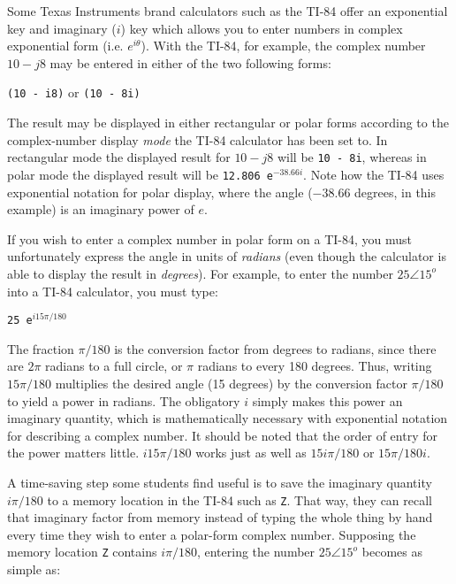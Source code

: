 \vskip 10pt

\filbreak

Some Texas Instruments brand calculators such as the TI-84 offer an exponential key and imaginary ($i$) key which allows you to enter numbers in complex exponential form (i.e. $e^{i \theta}$).  With the TI-84, for example, the complex number $10 - j8$ may be entered in either of the two following forms:

\vskip 10pt

{\tt (10 - i8)} \hskip 10pt or \hskip 10pt {\tt (10 - 8i)} 

\vskip 10pt

The result may be displayed in either rectangular or polar forms according to the complex-number display {\it mode} the TI-84 calculator has been set to.  In rectangular mode the displayed result for $10 - j8$ will be {\tt 10 - 8i}, whereas in polar mode the displayed result will be {\tt 12.806 e$^{-38.66i}$}.  Note how the TI-84 uses exponential notation for polar display, where the angle ($-38.66$ degrees, in this example) is an imaginary power of $e$.

\vskip 10pt

If you wish to enter a complex number in polar form on a TI-84, you must unfortunately express the angle in units of {\it radians} (even though the calculator is able to display the result in {\it degrees}).  For example, to enter the number $25 \angle 15^o$ into a TI-84 calculator, you must type:

\vskip 10pt

{\tt 25 e$^{i15 \pi / 180}$}

\vskip 10pt

The fraction $\pi / 180$ is the conversion factor from degrees to radians, since there are $2\pi$ radians to a full circle, or $\pi$ radians to every 180 degrees.  Thus, writing $15 \pi / 180$ multiplies the desired angle (15 degrees) by the conversion factor $\pi / 180$ to yield a power in radians.  The obligatory $i$ simply makes this power an imaginary quantity, which is mathematically necessary with exponential notation for describing a complex number.  It should be noted that the order of entry for the power matters little.  $i15 \pi / 180$ works just as well as $15 i \pi / 180$ or $15 \pi / 180 i$.

\vskip 10pt

A time-saving step some students find useful is to save the imaginary quantity $i \pi / 180$ to a memory location in the TI-84 such as {\tt Z}.  That way, they can recall that imaginary factor from memory instead of typing the whole thing by hand every time they wish to enter a polar-form complex number.  Supposing the memory location {\tt Z} contains $i \pi / 180$, entering the number $25 \angle 15^o$ becomes as simple as:

